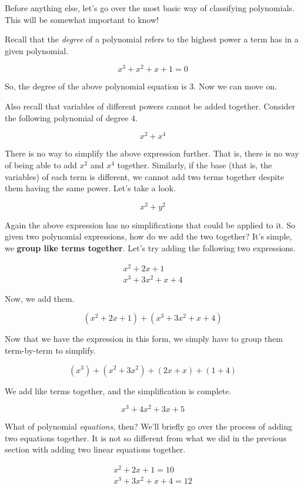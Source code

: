 \documentclass{scrbook}
\theoremstyle{definition}
\begin{document}
Before anything else, let's go over the most basic way of classifying polynomials. This will be somewhat important to know!

Recall that the \textit{degree} of a polynomial refers to the highest power a term has in a given polynomial.

\[
  x^3 + x^2 + x + 1 = 0
\]

So, the degree of the above polynomial equation is 3. Now we can move on.

Also recall that variables of different powers cannot be added together. Consider the following polynomial of degree 4.

\[
  x^2 + x^4
\]

There is no way to simplify the above expression further. That is, there is no way of being able to add $x^2$ and $x^4$ together. Similarly, if the base (that is, the variables) of each term is different, we cannot add two terms together despite them having the same power. Let's take a look.

\[
  x^2 + y^2
\]

Again the above expression has no simplifications that could be applied to it. So given two polynomial expressions, how do we add the two together? It's simple, we \textbf{group like terms together}. Let's try adding the following two expressions. 

\begin{align*}
  x^2 + 2x + 1\\
  x^3 + 3x^2 + x + 4
\end{align*}

Now, we add them.

\[
  (x^2 + 2x + 1) + (x^3 + 3x^2 + x + 4)
\]

Now that we have the expression in this form, we simply have to group them term-by-term to simplify. 

\[
  (x^3) + (x^2 + 3x^2) + (2x + x) + (1 + 4)
\]

We add like terms together, and the simplification is complete.

\[
  x^3 + 4x^2 + 3x + 5
\]

What of polynomial \textit{equations}, then? We'll briefly go over the process of adding two equations together. It is not so different from what we did in the previous section with adding two linear equations together. 

\begin{align*}
  x^2 + 2x + 1 = 10\\
  x^3 + 3x^2 + x + 4 = 12
\end{align*}
\end{document}
